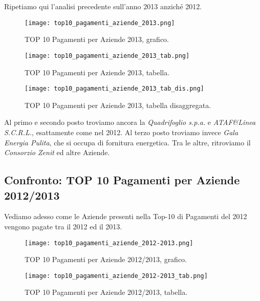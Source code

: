 			Ripetiamo qui l'analisi precedente sull'anno 2013 anziché 2012.\\
		
			\begin{figure}[h!]
				\centering
					\texttt{[image: top10\_pagamenti\_aziende\_2013.png]}
				\caption{TOP 10 Pagamenti per Aziende 2013, grafico.}
				\label{fig:top10_pagamenti_aziende_2013}
			\end{figure}
			
			\begin{figure}[h!]
				\centering
					\texttt{[image: top10\_pagamenti\_aziende\_2013\_tab.png]}
				\caption{TOP 10 Pagamenti per Aziende 2013, tabella.}
				\label{fig:top10_pagamenti_aziende_2013_tab}
			\end{figure}
			
			\begin{figure}[h!]
				\centering
					\texttt{[image: top10\_pagamenti\_aziende\_2013\_tab\_dis.png]}
				\caption{TOP 10 Pagamenti per Aziende 2013, tabella disaggregata.}
				\label{fig:top10_pagamenti_aziende_2013_tab_dis}
			\end{figure}
			
			Al primo e secondo posto troviamo ancora la \textit{Quadrifoglio s.p.a.} e \textit{ATAF\&Linea S.C.R.L.}, esattamente come nel 2012. Al terzo posto troviamo invece \textit{Gala Energia Pulita}, che si occupa di fornitura energetica. Tra le altre, ritroviamo il \textit{Consorzio Zenit} ed altre Aziende.
			
			\FloatBarrier
		
		\subsection{Confronto: TOP 10 Pagamenti per Aziende 2012/2013} \label{subsec:pagamenti_aziende_2012/2013}
	
			Vediamo adesso come le Aziende presenti nella Top-10 di Pagamenti del 2012 vengono pagate tra il 2012 ed il 2013.\\
	
			\begin{figure}[h!]
				\centering
					\texttt{[image: top10\_pagamenti\_aziende\_2012-2013.png]}
				\caption{TOP 10 Pagamenti per Aziende 2012/2013, grafico.}
				\label{fig:top10_pagamenti_aziende_2012-2013}
			\end{figure}
			
			\begin{figure}[h!]
				\centering
					\texttt{[image: top10\_pagamenti\_aziende\_2012-2013\_tab.png]}
				\caption{TOP 10 Pagamenti per Aziende 2012/2013, tabella.}
				\label{fig:top10_pagamenti_aziende_2012-2013_tab}
			\end{figure}
			
